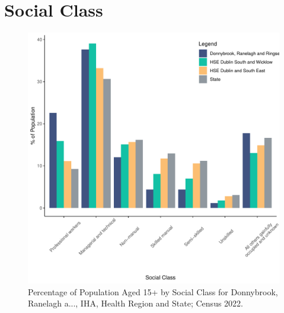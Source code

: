 \documentclass{article}
\begin{document}
\section{Social Class}\label{sect:SC}
\begin{figure}[H]
	\centering
	\includegraphics[width = 140mm]{../figures/SocialClassED.pdf}
	\caption{Percentage of Population Aged 15+ by Social Class for Donnybrook, Ranelagh a..., IHA, Health Region and State; Census 2022.}
	\label{fig:vbnv}
	\end{figure}
\end{document}
